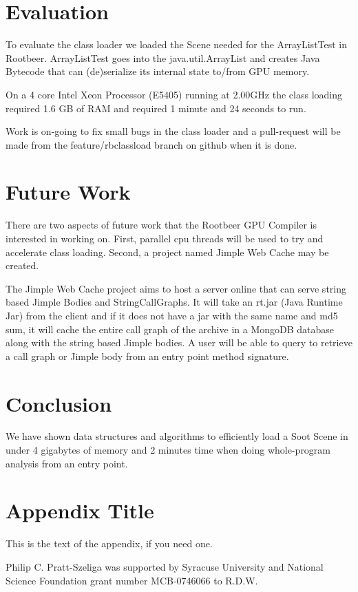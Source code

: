 \documentclass[preprint]{sigplanconf}
\begin{document}
\section{Evaluation}
\label{sec:eval}
To evaluate the class loader we loaded the Scene needed for the ArrayListTest in Rootbeer. ArrayListTest goes into the java.util.ArrayList and creates Java Bytecode that can (de)serialize its internal state to/from GPU memory.

On a 4 core Intel Xeon Processor (E5405) running at 2.00GHz the class loading required 1.6 GB of RAM and required 1 minute and 24 seconds to run. 

Work is on-going to fix small bugs in the class loader and a pull-request will be made from the feature/rbclassload branch on github when it is done.

\section{Future Work}
\label{sec:future}
There are two aspects of future work that the Rootbeer GPU Compiler is interested in working on. First, parallel cpu threads will be used to try and accelerate class loading. Second, a project named Jimple Web Cache may be created.

The Jimple Web Cache project aims to host a server online that can serve string based Jimple Bodies and StringCallGraphs. It will take an rt.jar (Java Runtime Jar) from the client and if it does not have a jar with the same name and md5 sum, it will cache the entire call graph of the archive in a MongoDB database along with the string based Jimple bodies. A user will be able to query to retrieve a call graph or Jimple body from an entry point method signature.

\section{Conclusion}
\label{sec:conclusion}
We have shown data structures and algorithms to efficiently load a Soot Scene in under 4 gigabytes of memory and 2 minutes time when doing whole-program analysis from an entry point.

\appendix
\section{Appendix Title}

This is the text of the appendix, if you need one.

\acks
Philip C. Pratt-Szeliga was supported by Syracuse University and National Science Foundation grant number MCB-0746066 to R.D.W.
\end{document}

